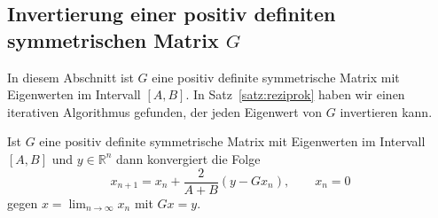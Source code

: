%
%
\subsection{Invertierung einer positiv definiten symmetrischen Matrix $G$
\label{subsection:ginv}}
In diesem Abschnitt ist $G$ eine positiv definite symmetrische Matrix 
mit Eigenwerten im Intervall $[A,B]$.
In Satz~\ref{satz:reziprok} haben wir einen iterativen Algorithmus
gefunden, der jeden Eigenwert von $G$ invertieren kann.


\begin{satz}
\label{satz:ginv}
Ist $G$ eine positiv definite symmetrische Matrix mit Eigenwerten im
Intervall $[A,B]$ und $y\in\mathbb R^n$ dann konvergiert die Folge
\[
x_{n+1} = x_n + \frac{2}{A+B} (y - Gx_n),\qquad x_n = 0
\]
gegen 
$
x=\lim_{n\to\infty} x_n
$
mit $Gx=y$.
\end{satz}

